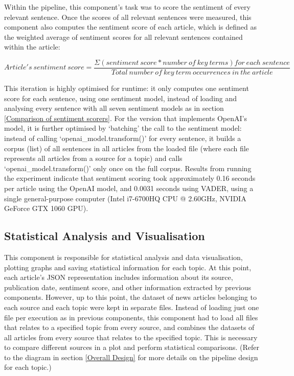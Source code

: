 \documentclass{report}
\begin{document}
Within the pipeline, this component's task was to score the sentiment of every relevant sentence.
Once the scores of all relevant sentences were measured, this component also computes the sentiment score of each article, which is defined as the weighted average of sentiment scores for all relevant sentences contained within the article:

\begin{center}
	$Article's \ sentiment \ score = \dfrac{\Sigma (sentiment \ score * number \ of \ key \ terms) for \ each \ sentence}{Total \ number \ of \ key \ term \ occurrences \ in \ the \ article}$
\end{center}

This iteration is highly optimised for runtime: it only computes one sentiment score for each sentence, using one sentiment model, instead of loading and analysing every sentence with all seven sentiment models as in section \ref{Comparison of sentiment scorers}.
For the version that implements OpenAI's model, it is further optimised by `batching' the call to the sentiment model: instead of calling `openai\_model.transform()' for every sentence, it builds a corpus (list) of all sentences in all articles from the loaded file (where each file represents all articles from a source for a topic) and calls `openai\_model.transform()' only once on the full corpus.
Results from running the experiment indicate that sentiment scoring took approximately 0.16 seconds per article using the OpenAI model, and 0.0031 seconds using VADER, using a single general-purpose computer (Intel i7-6700HQ CPU @ 2.60GHz, NVIDIA GeForce GTX 1060 GPU).

\subsection{Statistical Analysis and Visualisation} \label{des-visualisation}

This component is responsible for statistical analysis and data visualisation, plotting graphs and saving statistical information for each topic.
At this point, each article's JSON representation includes information about its source, publication date, sentiment score, and other information extracted by previous components.
However, up to this point, the dataset of news articles belonging to each source and each topic were kept in separate files.
Instead of loading just one file per execution as in previous components, this component had to load all files that relates to a specified topic from every source, and combines the datasets of all articles from every source that relates to the specified topic.
This is necessary to compare different sources in a plot and perform statistical comparisons.
(Refer to the diagram in section \ref{Overall Design} for more details on the pipeline design for each topic.)
\end{document}
